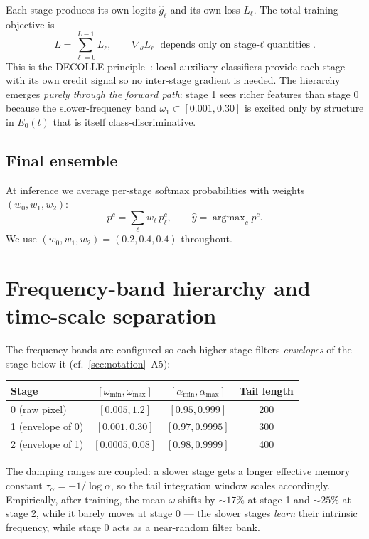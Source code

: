 \documentclass[11pt]{article}
\DeclareMathOperator*{\argmax}{argmax}
\begin{document}
Each stage produces its own logits $\hat g_\ell$ and its own loss
$L_\ell$. The total training objective is
\begin{equation}
L = \sum_{\ell=0}^{L-1} L_\ell, \qquad
\nabla_\theta L_\ell \text{ depends only on stage-$\ell$ quantities}.
\end{equation}
This is the DECOLLE principle~\cite{decolle}: local auxiliary classifiers
provide each stage with its own credit signal so no inter-stage gradient
is needed. The hierarchy emerges \emph{purely through the forward path}:
stage 1 sees richer features than stage 0 because the slower-frequency
band $\omega_1 \subset [0.001, 0.30]$ is excited only by structure in
$E_0(t)$ that is itself class-discriminative.

\subsection{Final ensemble}

At inference we average per-stage softmax probabilities with weights
$(w_0, w_1, w_2)$:
\begin{equation}
p^c = \sum_\ell w_\ell\, p_\ell^c, \qquad
\hat y = \argmax_c p^c.
\end{equation}
We use $(w_0, w_1, w_2) = (0.2, 0.4, 0.4)$ throughout.

\section{Frequency-band hierarchy and time-scale separation}

The frequency bands are configured so each higher stage filters
\emph{envelopes} of the stage below it (cf.~\ref{sec:notation}~A5):

\begin{center}
\begin{tabular}{@{}lccc@{}}
\toprule
Stage & $[\omega_{\min}, \omega_{\max}]$ & $[\alpha_{\min}, \alpha_{\max}]$ & Tail length \\
\midrule
0 (raw pixel) & $[0.005, 1.2]$        & $[0.95, 0.999]$    & 200 \\
1 (envelope of 0) & $[0.001, 0.30]$   & $[0.97, 0.9995]$   & 300 \\
2 (envelope of 1) & $[0.0005, 0.08]$  & $[0.98, 0.9999]$   & 400 \\
\bottomrule
\end{tabular}
\end{center}

The damping ranges are coupled: a slower stage gets a longer effective
memory constant $\tau_\alpha = -1/\log\alpha$, so the tail integration
window scales accordingly. Empirically, after training, the mean
$\omega$ shifts by $\sim 17\%$ at stage 1 and $\sim 25\%$ at stage 2,
while it barely moves at stage 0 --- the slower stages \emph{learn} their
intrinsic frequency, while stage 0 acts as a near-random filter bank.
\end{document}
